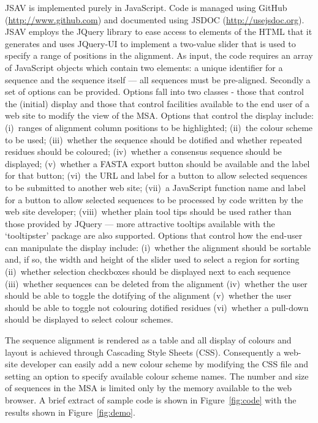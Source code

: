 \documentclass[10pt,a4paper,twocolumn]{article}
\begin{document}
JSAV is implemented purely in JavaScript. Code is managed using GitHub
(\url{http://www.github.com}) and documented using JSDOC
(\url{http://usejsdoc.org}). JSAV employs the JQuery library to ease
access to elements of the HTML that it generates and uses JQuery-UI to
implement a two-value slider that is used to specify a range of
positions in the alignment.  As input, the code requires an array of
JavaScript objects which contain two elements: a unique identifier for
a sequence and the sequence itself --- all sequences must be
pre-aligned.  Secondly a set of options can be provided. Options fall
into two classes - those that control the (initial) display and those
that control facilities available to the end user of a web site to
modify the view of the MSA. Options that control the display include:
(i)~ranges of alignment column positions to be highlighted; (ii)~the
colour scheme to be used; (iii)~whether the sequence should be
dotified and whether repeated residues should be coloured;
(iv)~whether a consensus sequence should be displayed; (v)~whether a
FASTA export button should be available and the label for that button;
(vi)~the URL and label for a button to allow selected sequences to be
submitted to another web site; (vii)~a JavaScript function name and
label for a button to allow selected sequences to be processed by code
written by the web site developer; (viii)~whether plain tool tips
should be used rather than those provided by JQuery --- more
attractive tooltips available with the `tooltipster' package are also
supported. Options that control how the end-user can manipulate the
display include: (i)~whether the alignment should be sortable and, if
so, the width and height of the slider used to select a region for
sorting (ii)~whether selection checkboxes should be displayed next to
each sequence (iii)~whether sequences can be deleted from the
alignment (iv)~whether the user should be able to toggle the dotifying
of the alignment (v)~whether the user should be able to toggle not
colouring dotified residues (vi)~whether a pull-down should be
displayed to select colour schemes.

The sequence alignment is rendered as a table and all display of
colours and layout is achieved through Cascading Style Sheets (CSS).
Consequently a web-site developer can easily add a new colour scheme
by modifying the CSS file and setting an option to specify available
colour scheme names.  The number and size of sequences in the MSA is
limited only by the memory available to the web browser.  A brief
extract of sample code is shown in Figure~\ref{fig:code} with the
results shown in Figure~\ref{fig:demo}.
\end{document}
